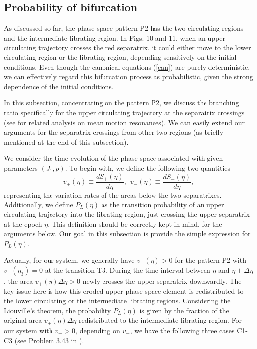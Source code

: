 \documentclass[useAMS,usenatbib,twocolumn]{mn2e}
\newcommand{\beq}{\begin{equation}}
\newcommand{\eeq}{\end{equation}}
\begin{document}
\subsection{Probability of bifurcation}

As discussed so far, the phase-space pattern P2 has the two circulating regions  and the intermediate librating region. In Figs. 10 and 11, when an upper circulating trajectory crosses the red
separatrix, it could either move to the lower circulating region or the librating region, depending sensitively on the initial conditions.  Even though the canonical equations (\ref{can}) are purely deterministic, we can effectively regard this bifurcation process as probabilistic, given the strong dependence of the initial conditions. 

In this subsection, concentrating on the pattern P2, we discuss the branching ratio specifically for the upper circulating trajectory at the separatrix crossings (see \citealt{henrard1982,borderies1984,ssd,gd} for related analysis on mean motion resonances). We can easily extend our arguments for the separatrix crossings from other two regions (as briefly mentioned at the end of this subsection). 

We  consider the time evolution of the  phase space associated with given parameters $(J_1,p)$. To begin with, we define the following two quantities
\beq
v_{+}(\eta)\equiv\frac{dS_{+}(\eta)}{d\eta},~~v_{-}(\eta)\equiv\frac{dS_{-}(\eta)}{d\eta},
\eeq
representing the variation rates of the areas below the two separatrixes.  Additionally,  we define $P_L(\eta)$ as the transition probability of an upper circulating trajectory into the librating region, just crossing the upper separatrix  at the epoch $\eta$.
This definition should be correctly kept in mind, for the arguments below.  Our goal in this subsection is provide the simple expression for $P_L(\eta)$.



Actually, for our system, we generally have $v_{+}(\eta)>0$ for the pattern P2 with $v_{+}(\eta_3)=0$ at the transition T3. 
During the time interval between $\eta$ and $\eta+\Delta \eta$, the area $v_+(\eta)\Delta \eta>0$ newly crosses the upper separatrix downwardly.  The key issue here is how this eroded upper phase-space element is redistributed to the lower circulating or the intermediate  librating regions. Considering the Liouville's theorem, the probability $P_L(\eta)$ is given by the fraction of the original area  $v_+(\eta)\Delta \eta$  redistributed to the intermediate librating region. 
  For our system with $v_+>0$, depending on  $v_-$, we have the following three cases C1-C3 (see Problem 3.43 in \citealt{gd}).
\end{document}

